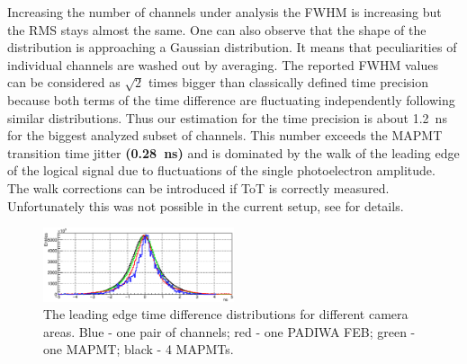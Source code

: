 \documentclass[final,5p,times,twocolumn]{elsarticle}
\begin{document}
%
%

Increasing the number of channels under analysis the FWHM is increasing but the RMS stays almost the same. One can also observe that the shape of the distribution is approaching a Gaussian distribution. It means that peculiarities of individual channels are washed out by averaging. The reported FWHM values can be considered as $ \sqrt 2 $ times bigger than classically defined time precision because both terms of the time difference are fluctuating independently following similar distributions. Thus our estimation for the time precision is about 1.2~ns for the biggest analyzed subset of channels. This number exceeds the MAPMT transition time jitter \textbf{(0.28~ns)} and is dominated by the walk of the leading edge of the logical signal due to fluctuations of the single photoelectron amplitude. The walk corrections can be introduced if ToT is correctly measured. Unfortunately this was not possible in the current setup, see \cite{PEPAN} for details.

\begin{figure}[h]
	\centering
	\includegraphics[width=0.5\textwidth]{figures/TimePrecision_evolution_noStats2.eps}
	\caption{The leading edge time difference distributions for different camera areas. Blue - one pair of channels; red - one PADIWA FEB; green - one MAPMT; black - 4 MAPMTs.}
	\label{fig:TimePrec}
\end{figure}
\end{document}
